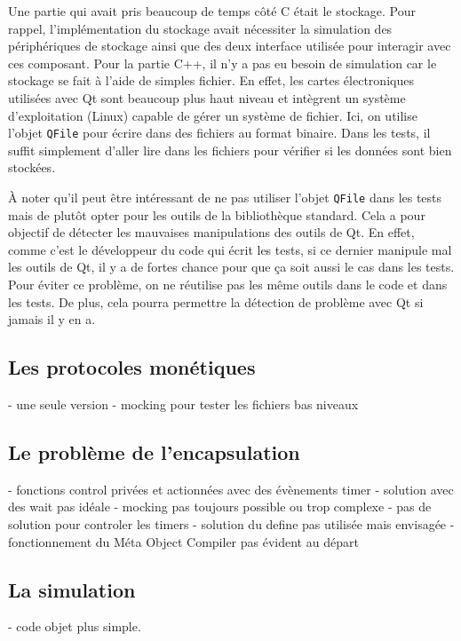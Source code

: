 \documentclass[a4paper]{article}
\begin{document}
Une partie qui avait pris beaucoup de temps côté C était le stockage. Pour
rappel, l'implémentation du stockage avait nécessiter la simulation des
périphériques de stockage ainsi que des deux interface utilisée pour interagir
avec ces composant. Pour la partie C++, il n'y a pas eu besoin de simulation car
le stockage se fait à l'aide de simples fichier. En effet, les cartes
électroniques utilisées avec Qt sont beaucoup plus haut niveau et intègrent un
système d'exploitation (Linux) capable de gérer un système de fichier. Ici, on
utilise l'objet \verb|QFile| pour écrire dans des fichiers au format binaire.
Dans les tests, il suffit simplement d'aller lire dans les fichiers pour
vérifier si les données sont bien stockées.

À noter qu'il peut être intéressant de ne pas utiliser l'objet \verb|QFile|
dans les tests mais de plutôt opter pour les outils de la bibliothèque
standard. Cela a pour objectif de détecter les mauvaises manipulations des
outils de Qt. En effet, comme c'est le développeur du code qui écrit les tests,
si ce dernier manipule mal les outils de Qt, il y a de fortes chance pour que ça
soit aussi le cas dans les tests. Pour éviter ce problème, on ne réutilise pas
les même outils dans le code et dans les tests. De plus, cela pourra permettre
la détection de problème avec Qt si jamais il y en a.

\subsection{Les protocoles monétiques}

- une seule version
- mocking pour tester les fichiers bas niveaux

\subsection{Le problème de l'encapsulation}

- fonctions control privées et actionnées avec des évènements timer
- solution avec des wait pas idéale
- mocking pas toujours possible ou trop complexe
- pas de solution pour controler les timers
- solution du define pas utilisée mais envisagée
- fonctionnement du Méta Object Compiler pas évident au départ

\subsection{La simulation}

- code objet plus simple.
\end{document}
